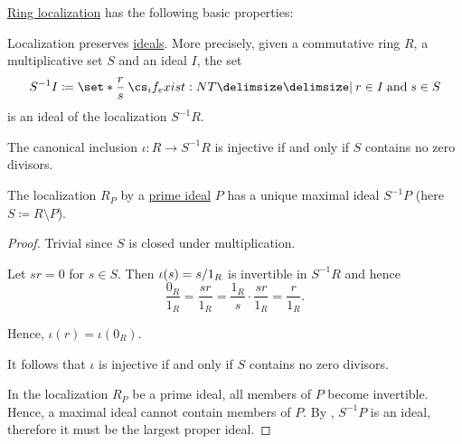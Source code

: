 \begin{proposition}\label{thm:def:ring_localization/properties}
  \hyperref[def:ring_localization]{Ring localization} has the following basic properties:

  \begin{thmenum}
     Localization preserves \hyperref[def:semiring_ideal]{ideals}. More precisely, given a commutative ring \( R \), a multiplicative set \( S \) and an ideal \( I \), the set
    \begin{equation*}
      S^{-1} I \coloneqq \set*{ \frac r s \given* r \in I \T{and} s \in S }
    \end{equation*}
    is an ideal of the localization \( S^{-1} R \).

     The canonical inclusion \( \iota: R \to S^{-1} R \) is injective if and only if \( S \) contains no zero divisors.

     The localization \( R_P \) by a \hyperref[def:semiring_ideal/prime]{prime ideal} \( P \) has a unique maximal ideal \( S^{-1} P \) (here \( S \coloneqq R \setminus P \)).
  \end{thmenum}
\end{proposition}
\begin{proof}
   Trivial since \( S \) is closed under multiplication.

   Let \( sr = 0 \) for \( s \in S \). Then \( \iota(s) = s / 1_R \) is invertible in \( S^{-1} R \) and hence
  \begin{equation*}
    \frac {0_R} {1_R}
    =
    \frac {sr} {1_R}
    =
    \frac {1_R} s \cdot \frac {sr} {1_R}
    =
    \frac r {1_R}.
  \end{equation*}

  Hence, \( \iota(r) = \iota(0_R) \).

  It follows that \( \iota \) is injective if and only if \( S \) contains no zero divisors.

   In the localization \( R_P \) be a prime ideal, all members of \( P \) become invertible. Hence, a maximal ideal cannot contain members of \( P \). By , \( S^{-1} P \) is an ideal, therefore it must be the largest proper ideal.
\end{proof}
